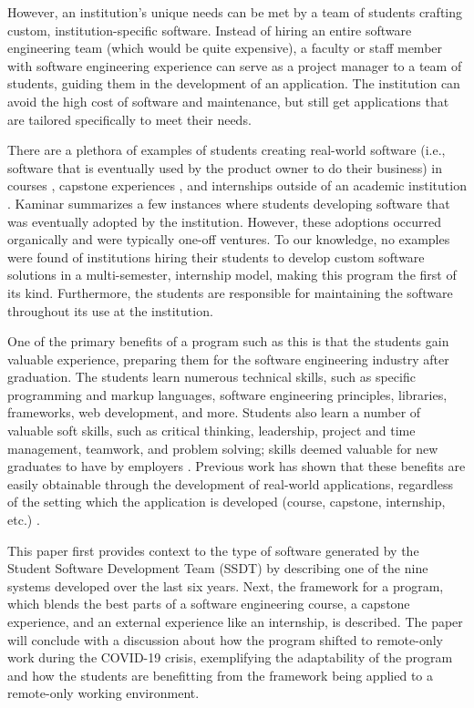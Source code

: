 However, an institution's unique needs can be met by a team of students crafting custom, institution-specific software. Instead of hiring an entire software engineering team (which would be quite expensive), a faculty or staff member with software engineering experience can serve as a project manager to a team of students, guiding them in the development of an application. The institution can avoid the high cost of software and maintenance, but still get applications that are tailored specifically to meet their needs.

There are a plethora of examples of students creating real-world software (i.e., software that is eventually used by the product owner to do their business) in courses \cite{tadayon2004software}, capstone experiences \cite{capstone}, and internships outside of an academic institution \cite{rochesterfirstundergradsoftwareteam}. Kaminar \cite{kaminer_2014} summarizes a few instances where students developing software that was eventually adopted by the institution. However, these adoptions occurred organically and were typically one-off ventures. To our knowledge, no examples were found of institutions hiring their students to develop custom software solutions in a multi-semester, internship model, making this program the first of its kind. Furthermore, the students are responsible for maintaining the software throughout its use at the institution.

One of the primary benefits of a program such as this is that the students gain valuable experience, preparing them for the software engineering industry after graduation. The students learn numerous technical skills, such as specific programming and markup languages, software engineering principles, libraries, frameworks, web development, and more. Students also learn a number of valuable soft skills, such as critical thinking, leadership, project and time management, teamwork, and problem solving; skills deemed valuable for new graduates to have by employers \cite{lavy2013soft}. Previous work has shown that these benefits are easily obtainable through the development of real-world applications, regardless of the setting which the application is developed (course, capstone, internship, etc.) \cite{heggen2018hiring, liu2005enriching, alzamil2005towards}.

This paper first provides context to the type of software generated by the Student Software Development Team (SSDT) by describing one of the nine systems developed over the last six years. Next, the framework for a program, which blends the best parts of a software engineering course, a capstone experience, and an external experience like an internship, is described. The paper will conclude with a discussion about how the program shifted to remote-only work during the COVID-19 crisis, exemplifying the adaptability of the program and how the students are benefitting from the framework being applied to a remote-only working environment.
